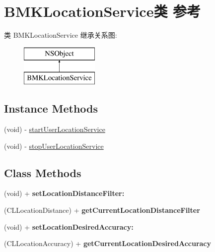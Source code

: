 \hypertarget{interface_b_m_k_location_service}{\section{B\+M\+K\+Location\+Service类 参考}
\label{interface_b_m_k_location_service}
}
类 B\+M\+K\+Location\+Service 继承关系图\+:\begin{figure}[H]
\begin{center}
\leavevmode
\includegraphics[height=2.000000cm]{interface_b_m_k_location_service}
\end{center}
\end{figure}
\subsection*{Instance Methods}
\begin{DoxyCompactItemize}
\item 
(void) -\/ \hyperlink{interface_b_m_k_location_service_a3b49abd4104d23a114b7a7a632ff3722}{start\+User\+Location\+Service}
\item 
(void) -\/ \hyperlink{interface_b_m_k_location_service_a1aece8fbe579debdd0984147e036e947}{stop\+User\+Location\+Service}
\end{DoxyCompactItemize}
\subsection*{Class Methods}
\begin{DoxyCompactItemize}
\item 
\hypertarget{interface_b_m_k_location_service_abc5a09b7684f33dba3b9863a8e279d9d}{(void) + {\bfseries set\+Location\+Distance\+Filter\+:}}\label{interface_b_m_k_location_service_abc5a09b7684f33dba3b9863a8e279d9d}

\item 
\hypertarget{interface_b_m_k_location_service_a7bedc55fa842dc67e5e6e332de2f934e}{(C\+L\+Location\+Distance) + {\bfseries get\+Current\+Location\+Distance\+Filter}}\label{interface_b_m_k_location_service_a7bedc55fa842dc67e5e6e332de2f934e}

\item 
\hypertarget{interface_b_m_k_location_service_aab4e97f6d6d047ef81895a3acff0f5b4}{(void) + {\bfseries set\+Location\+Desired\+Accuracy\+:}}\label{interface_b_m_k_location_service_aab4e97f6d6d047ef81895a3acff0f5b4}

\item 
\hypertarget{interface_b_m_k_location_service_a3b0b3c85476716fbbea4a535e38e038c}{(C\+L\+Location\+Accuracy) + {\bfseries get\+Current\+Location\+Desired\+Accuracy}}\label{interface_b_m_k_location_service_a3b0b3c85476716fbbea4a535e38e038c}

\end{DoxyCompactItemize}
